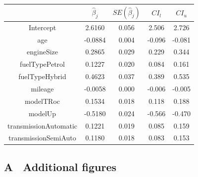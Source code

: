 \documentclass[12 pt]{scrartcl}
\begin{document}
\begin{table}[ht]
  \centering
  \label{tab:finalregression}
  \begin{tabular}{c|cccc}
                          & $\hat{\beta}_j$ & $SE(\hat{\beta}_j)$ & $CI_l$ & $CI_u$ \\
    \hline
    Intercept             & 2.6160          & 0.056               & 2.506  & 2.726  \\
    age                   & -0.0884         & 0.004               & -0.096 & -0.081 \\
    engineSize            & 0.2865          & 0.029               & 0.229  & 0.344  \\
    fuelTypePetrol        & 0.1227          & 0.020               & 0.084  & 0.161  \\
    fuelTypeHybrid        & 0.4623          & 0.037               & 0.389  & 0.535  \\
    mileage               & -0.0058         & 0.000               & -0.006 & -0.005 \\
    modelTRoc             & 0.1534          & 0.018               & 0.118  & 0.188  \\
    modelUp               & -0.5180         & 0.024               & -0.566 & -0.470 \\
    transmissionAutomatic & 0.1221          & 0.019               & 0.085  & 0.159  \\
    transmissionSemiAuto  & 0.1180          & 0.018               & 0.083  & 0.153  \\
  \end{tabular}
\end{table}






\newpage
{}
\renewcommand\refname{Bibliography}


\newpage
\appendix
{}
\subsection*{A \ Additional figures}
\end{document}
